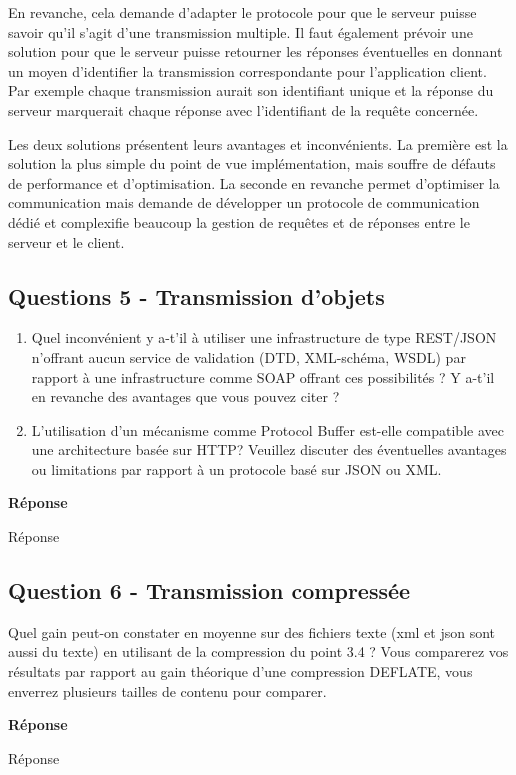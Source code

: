 \documentclass[francais,12pt]{article}
\begin{document}
	En revanche, cela demande d'adapter le protocole pour que le serveur puisse savoir qu'il s'agit d'une transmission multiple. Il faut également prévoir une solution pour que le serveur puisse retourner les réponses éventuelles en donnant un moyen d'identifier la transmission correspondante pour l'application client. Par exemple chaque transmission aurait son identifiant unique et la réponse du serveur marquerait chaque réponse avec l'identifiant de la requête concernée.
	
	Les deux solutions présentent leurs avantages et inconvénients. La première est la solution la plus simple du point de vue implémentation, mais souffre de défauts de performance et d'optimisation. La seconde en revanche permet d'optimiser la communication mais demande de développer un protocole de communication dédié et complexifie beaucoup la gestion de requêtes et de réponses entre le serveur et le client.
	
	
	\subsection*{Questions 5 - Transmission d'objets}  
	\begin{enumerate}
		\item Quel inconvénient y a-t'il à utiliser une infrastructure de type REST/JSON n'offrant aucun service de validation (DTD, XML-schéma, WSDL) par rapport à une infrastructure comme SOAP offrant ces possibilités ? Y a-t'il en revanche des avantages que vous pouvez citer ?
		\item L'utilisation d'un mécanisme comme Protocol Buffer est-elle compatible avec une architecture basée sur HTTP? Veuillez discuter des éventuelles avantages ou limitations par rapport à un protocole basé sur JSON ou XML.
	\end{enumerate} 
	
	{\color[rgb]{0,0.5,0.23}\textbf{Réponse}}
	
	Réponse
	
	\subsection*{Question 6 - Transmission compressée}
	Quel gain peut-on constater en moyenne sur des fichiers texte (xml et json sont aussi du texte) en utilisant de la compression du point 3.4 ? Vous comparerez vos résultats par rapport au gain théorique d'une compression DEFLATE, vous enverrez plusieurs tailles de contenu pour comparer.
	
	{\color[rgb]{0,0.5,0.23}\textbf{Réponse}}
	
	Réponse
	
	
\end{document}
